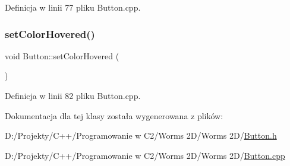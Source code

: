 Definicja w linii 77 pliku Button.\+cpp.

\mbox{\label{class_button_a0f71bfa269ec47509592cb2e4bed9a90}} 
\subsubsection{\texorpdfstring{set\+Color\+Hovered()}{setColorHovered()}}
{\footnotesize\ttfamily void Button\+::set\+Color\+Hovered (\begin{DoxyParamCaption}{ }\end{DoxyParamCaption})}



Definicja w linii 82 pliku Button.\+cpp.



Dokumentacja dla tej klasy została wygenerowana z plików\+:\begin{DoxyCompactItemize}
\item 
D\+:/\+Projekty/\+C++/\+Programowanie w C2/\+Worms 2\+D/\+Worms 2\+D/\mbox{\hyperlink{_button_8h}{Button.\+h}}\item 
D\+:/\+Projekty/\+C++/\+Programowanie w C2/\+Worms 2\+D/\+Worms 2\+D/\mbox{\hyperlink{_button_8cpp}{Button.\+cpp}}\end{DoxyCompactItemize}
